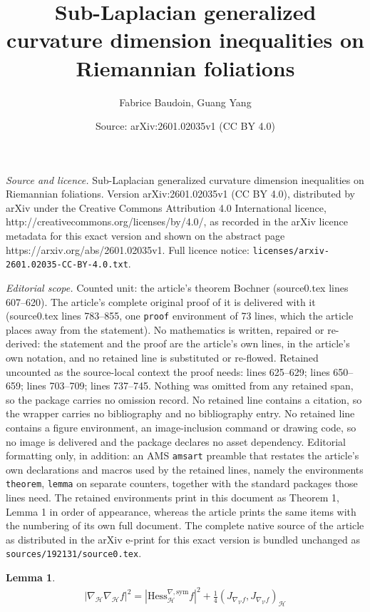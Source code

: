 \documentclass[10pt,a4paper]{amsart}
\title{Sub-Laplacian generalized curvature dimension inequalities on Riemannian foliations}
\author{Fabrice Baudoin, Guang Yang}
\date{Source: arXiv:2601.02035v1 (CC BY 4.0)}
\newtheorem{lemma}{Lemma}
\newcommand{\Ho}{\mathcal H}
\newcommand{\V}{\mathcal V}
\begin{document}
\maketitle

\noindent\emph{Source and licence.} Sub-Laplacian generalized curvature dimension inequalities on Riemannian foliations. Version arXiv:2601.02035v1 (CC BY 4.0), distributed by arXiv under the Creative Commons Attribution 4.0 International licence, http://creativecommons.org/licenses/by/4.0/, as recorded in the arXiv licence metadata for this exact version and shown on the abstract page https://arxiv.org/abs/2601.02035v1. Full licence notice: \texttt{licenses/arxiv-2601.02035-CC-BY-4.0.txt}.\par\smallskip

\noindent\textit{Editorial scope.} Counted unit: the article's theorem Bochner (source0.tex lines 607--620). The article's complete original proof of it is delivered with it (source0.tex lines 783--855, one \texttt{proof} environment of 73 lines, which the article places away from the statement). No mathematics is written, repaired or re-derived: the statement and the proof are the article's own lines, in the article's own notation, and no retained line is substituted or re-flowed.  Retained uncounted as the source-local context the proof needs: lines 625--629; lines 650--659; lines 703--709; lines 737--745.  Nothing was omitted from any retained span, so the package carries no omission record.  No retained line contains a citation, so the wrapper carries no bibliography and no bibliography entry.  No retained line contains a figure environment, an image-inclusion command or drawing code, so no image is delivered and the package declares no asset dependency.  Editorial formatting only, in addition: an AMS \texttt{amsart} preamble that restates the article's own declarations and macros used by the retained lines, namely the environments \texttt{theorem}, \texttt{lemma} on separate counters, together with the standard packages those lines need.  The retained environments print in this document as Theorem 1, Lemma 1 in order of appearance, whereas the article prints the same items with the numbering of its own full document.  The complete native source of the article as distributed in the arXiv e-print for this exact version is bundled unchanged as \texttt{sources/192131/source0.tex}.
	\begin{lemma}\label{symmetrized-hessian}
		\begin{align*}
			|\nabla_\Ho \nabla_\Ho f|^2 =| \mathrm{Hess}_\Ho^{\nabla, \mathrm{sym}} f|^2 +\frac{1}{4}( J_{\nabla_\V f} , J_{\nabla_\V f} )_\Ho
		\end{align*}
	\end{lemma}
\end{document}
